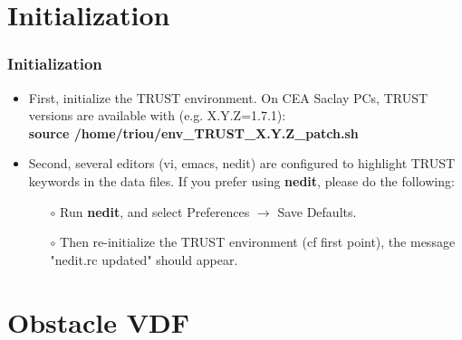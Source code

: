 \documentclass[10pt]{beamer}
\begin{document}
\section{Initialization}
\begin{frame}
\frametitle{Initialization}
\begin{block}{}

\begin{itemize}
\item First, initialize the TRUST environment. On CEA Saclay PCs, TRUST versions are available with (e.g. X.Y.Z=1.7.1):\\
\vspace{0.2cm}
\textbf{source  /home/triou/env\_TRUST\_X.Y.Z\_patch.sh}
\vspace{0.5cm}

\item Second, several editors (vi, emacs, nedit) are configured to highlight TRUST keywords in the data files. If you prefer using \textbf{nedit}, please do the following:

    \begin{itemize}
    \item [$\circ$] Run \textbf{nedit}, and select Preferences $\rightarrow$ Save Defaults.
    \item [$\circ$] Then re-initialize the TRUST environment (cf first point), the message "nedit.rc updated" should appear.
    \end{itemize}
\end{itemize}

\end{block}
\end{frame}



\section{Obstacle VDF}
\end{document}
